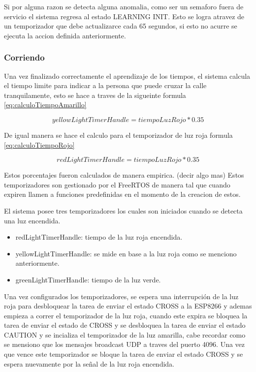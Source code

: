 Si por alguna razon se detecta alguna anomalia, como ser un semaforo fuera de servicio el sistema regresa al estado LEARNING INIT. Esto se logra atravez de un temporizador que debe actualizarce cada 65 segundos, si esto no acurre se ejecuta la accion definida anteriormente.

\subsubsection{Corriendo}
Una vez finalizado correctamente el aprendizaje de los tiempos, el sistema calcula el tiempo limite para indicar a la persona que puede cruzar la calle tranquilamente, esto se hace a traves de la sigueinte formula \ref{eq:calculoTiempoAmarillo}

\begin{equation}
\label{eq:calculoTiempoAmarillo}
yellowLightTimerHandle = tiempoLuzRojo * 0.35
\end{equation}

De igual manera se hace el calculo para el temporizador de luz roja  formula \ref{eq:calculoTiempoRojo}

\begin{equation}
\label{eq:calculoTiempoRojo}
redLightTimerHandle = tiempoLuzRojo * 0.35
\end{equation}

Estos porcentajes fueron calculados de manera empirica. (decir algo mas) 
Estos temporizadores son gestionado por el FreeRTOS de manera tal que cuando expiren llamen a funciones predefinidas en el momento de la creacion de estos.

El sistema posee tres temporizadores los cuales son iniciados cuando se detecta una luz encendida.

\begin{itemize}
\item redLightTimerHandle: tiempo de la luz roja encendida.
\item yellowLightTimerHandle: se mide en base a la luz roja como se menciono anteriormente.
\item greenLightTimerHandle: tiempo de la luz verde.
\end{itemize}

Una vez configurados los temporizadores, se espera una interrupción de la luz roja para desbloquear la tarea de enviar el estado CROSS a la ESP8266 y ademas empieza a correr el temporizador de la luz roja, cuando este expira se bloquea la tarea de enviar el estado de CROSS y se desbloquea la tarea de enviar el estado CAUTION y se incializa el temporizador de la luz amarilla, cabe recordar como se mensiono que los mensajes broadcast UDP  a traves del puerto 4096. Una vez que vence este temporizador se bloque la tarea de enviar el estado CROSS y se espera nuevamente por la señal de la luz roja encendida.

